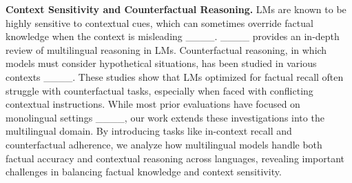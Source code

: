 \textbf{Context Sensitivity and Counterfactual Reasoning.} LMs are known to be highly sensitive to contextual cues, which can sometimes override factual knowledge when the context is misleading ____. ____ provides an in-depth review of multilingual reasoning in LMs. Counterfactual reasoning, in which models must consider hypothetical situations, has been studied in various contexts ____. These studies show that LMs optimized for factual recall often struggle with counterfactual tasks, especially when faced with conflicting contextual instructions. While most prior evaluations have focused on monolingual settings ____, our work extends these investigations into the multilingual domain. By introducing tasks like in-context recall and counterfactual adherence, we analyze how multilingual models handle both factual accuracy and contextual reasoning across languages, revealing important challenges in balancing factual knowledge and context sensitivity.




